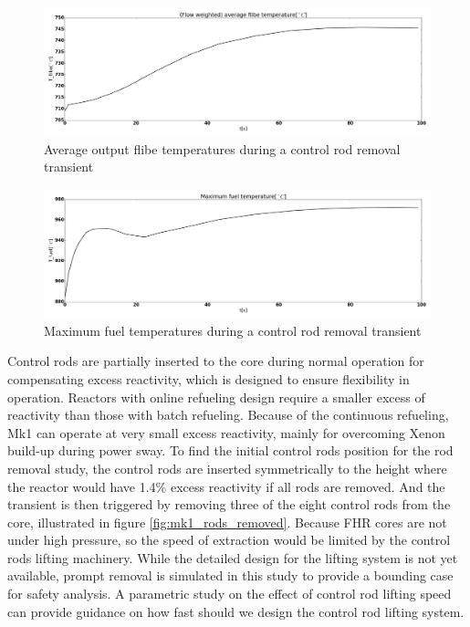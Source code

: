 \documentclass{elsarticle}
\begin{document}
\begin{figure}
    \centering
    \includegraphics[width=\textwidth]{images/diffusion/mk1/cr_RI/T_flibe_out.png}
    \caption{Average output flibe temperatures during a control rod removal transient}
    \label{fig:cr_flibe}
\end{figure}

\begin{figure}
    \centering
    \includegraphics[width=\textwidth]{images/diffusion/mk1/cr_RI/T_fuel_max.png}
    \caption{Maximum fuel temperatures during a control rod removal transient}
    \label{fig:cr_fuel}
\end{figure}


Control rods are partially inserted to the core during normal operation for compensating excess reactivity, which is designed to ensure flexibility in operation. Reactors with online refueling design require a smaller excess of reactivity than those with batch refueling. Because of the continuous refueling, Mk1 can operate at very small excess reactivity, mainly for overcoming Xenon build-up during power sway.
To find the initial control rods position for the rod removal study, the control rods are inserted symmetrically to the height where the reactor would have 1.4\% excess reactivity \cite{Reitsma2012} if all rods are removed. 
And the transient is then triggered by removing three of the eight control rods from the core, illustrated in figure \ref{fig:mk1_rods_removed}. Because FHR cores are not under high pressure, so the speed of extraction would be limited by the control rods lifting machinery. While the detailed design for the lifting system is not yet available, prompt removal is simulated in this study to provide a bounding case for safety analysis. A parametric study on the effect of control rod lifting speed can provide guidance on how fast should we design the control rod lifting system. 
\end{document}

